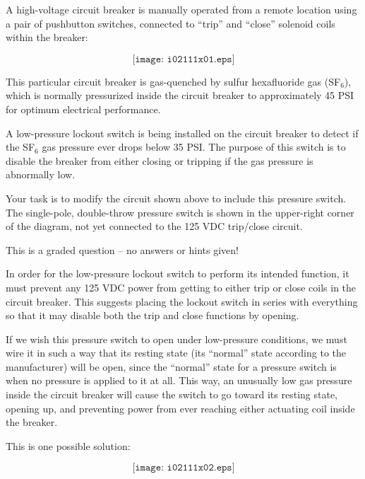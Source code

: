 

A high-voltage circuit breaker is manually operated from a remote location using a pair of pushbutton switches, connected to ``trip'' and ``close'' solenoid coils within the breaker:

$$\texttt{[image: i02111x01.eps]}$$

This particular circuit breaker is gas-quenched by sulfur hexafluoride gas (SF$_{6}$), which is normally pressurized inside the circuit breaker to approximately 45 PSI for optimum electrical performance.  

\vskip 10pt

A low-pressure lockout switch is being installed on the circuit breaker to detect if the SF$_{6}$ gas pressure ever drops below 35 PSI.  The purpose of this switch is to disable the breaker from either closing or tripping if the gas pressure is abnormally low.

Your task is to modify the circuit shown above to include this pressure switch.  The single-pole, double-throw pressure switch is shown in the upper-right corner of the diagram, not yet connected to the 125 VDC trip/close circuit.

\vfil 

\eject






This is a graded question -- no answers or hints given!







In order for the low-pressure lockout switch to perform its intended function, it must prevent any 125 VDC power from getting to either trip or close coils in the circuit breaker.  This suggests placing the lockout switch in series with everything so that it may disable both the trip and close functions by opening.

If we wish this pressure switch to open under low-pressure conditions, we must wire it in such a way that its resting state (its ``normal'' state according to the manufacturer) will be open, since the ``normal'' state for a pressure switch is when no pressure is applied to it at all.  This way, an unusually low gas pressure inside the circuit breaker will cause the switch to go toward its resting state, opening up, and preventing power from ever reaching either actuating coil inside the breaker.

\vskip 10pt

This is one possible solution:

$$\texttt{[image: i02111x02.eps]}$$




